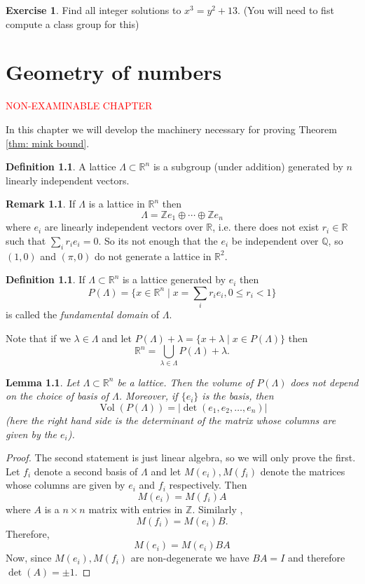 \documentclass[11pt,a4paper]{report}
\theoremstyle{plain}
\newtheorem{lem}[subsection]{Lemma}
\theoremstyle{definition}
\newtheorem{defn}[subsection]{Definition}
\theoremstyle{definition}
\newtheorem{rmrk}[subsection]{Remark}
\newtheorem{question}[subsection]{Exercise}
\newcommand{\ZZ}{\mathbb{Z}}
\newcommand{\RR}{\mathbb{R}}
\def\QQ{\mathbb{Q}}
\def \lam {\lambda}
\DeclareMathOperator{\Vol}{Vol}
\begin{document}
\begin{question}
	Find all integer solutions to $x^3=y^2+13$. (You will need to fist compute a class group for this)
\end{question}





\chapter{Geometry of numbers}

\textcolor{red}{NON-EXAMINABLE CHAPTER}

In this chapter we will develop the machinery necessary for proving Theorem \ref{thm: mink bound}.

\begin{defn}
	A lattice $\Lambda \subset \RR^n$ is a subgroup (under addition) generated by $n$ linearly independent vectors.
\end{defn}

\begin{rmrk}
	If $\Lambda$ is a lattice in $\RR^n$ then \[\Lambda= \ZZ e_1 \oplus \cdots \oplus \ZZ e_n\] where $e_i$ are linearly independent vectors over $\RR$, i.e. there does not exist $r_i \in \RR$ such that $\sum_i r_ie_i =0$.
	So its not enough that the $e_i$ be independent over $\QQ$, so $(1,0)$ and $(\pi,0)$ do not generate a lattice in $\RR^2$.
\end{rmrk}

\begin{defn}
	If $\Lambda \subset \RR^n$ is a lattice generated by $e_i$ then \[P(\Lambda)=\{x \in \RR^n \mid x=\sum_i r_ie_i, 0 \leq r_i < 1 \}\] is called the \textit{fundamental domain} of $\Lambda$.
\end{defn}

Note that if we $\lam \in \Lambda$  and let $P(\Lambda)+\lambda=\{x+ \lam \mid x \in P(\Lambda)\}$ then \[\RR^n= \bigcup_{\lam \in \Lambda} P(\Lambda) +\lam. \]

\begin{lem}
	Let $\Lambda \subset \RR^n$ be a lattice. Then the volume of $P(\Lambda)$ does not depend on the choice of basis of $\Lambda$. Moreover, if $\{e_i\}$ is the basis, then \[\Vol(P(\Lambda))=|\det(e_1,e_2,\dots,e_n)| \] (here the right hand side is the determinant of the matrix whose columns are given by the $e_i$).
\end{lem}

\begin{proof}
	The second statement is just linear algebra, so we will only prove the first. Let $f_i$ denote a second basis of $\Lambda$ and let $M(e_i), M(f_i)$ denote the matrices whose columns are given by $e_i$ and $f_i$ respectively.  Then \[M(e_i)=M(f_i)A\] where $A$ is a $n \times n$ matrix with entries in $\ZZ$. Similarly , \[M(f_i)=M(e_i)B.\] Therefore, \[M(e_i)=M(e_i)BA\]  Now, since $M(e_i),M(f_i)$ are non-degenerate we have $BA=I$ and therefore $\det(A)=\pm 1$.
\end{proof}
\end{document}
